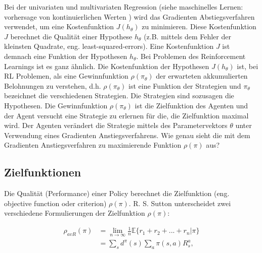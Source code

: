 \documentclass[conference]{IEEEtran}
\begin{document}
Bei der univariaten und multivariaten Regression (siehe maschinelles Lernen: vorhersage von kontinuierlichen Werten \cite{goodfellow_16}) wird das Gradienten Abstiegsverfahren verwendet, um eine Kostenfunktion $J(h_\theta)$ zu minimieren. Diese Kostenfunktion $J$ berechnet die Qualität einer Hypothese $h_\theta$ (z.B. mittels dem Fehler der kleinsten Quadrate, eng. least-squared-errors). Eine Kostenfunktion $J$ ist demnach eine Funktion der Hypothesen $h_\theta$. Bei Problemen des Reinforcement Learnings ist es ganz ähnlich. Die Kostenfunktion der Hypothesen $J(h_\theta)$ ist, bei RL Problemen, als eine Gewinnfunktion $\rho(\pi_\theta)$ der erwarteten akkumulierten Belohnungen zu verstehen, d.h. $\rho(\pi_\theta)$ ist eine Funktion der Strategien und $\pi_\theta$ bezeichnet die verschiedenen Strategien. Die Strategien sind sozusagen die Hypothesen. Die Gewinnfunktion $\rho(\pi_\theta)$ ist die Zielfunktion des Agenten und der Agent versucht eine Strategie zu erlernen für die, die Zielfunktion maximal wird. Der Agenten verändert die Strategie mittels des Parametervektors $\theta$ unter Verwendung eines Gradienten Anstiegsverfahrens. Wie genau sieht die mit dem Gradienten Anstiegsverfahren zu maximierende Funktion $\rho(\pi)$ aus?

\subsection{Zielfunktionen}
Die Qualität (Performance) einer Policy berechnet die Zielfunktion (eng. objective function oder criterion) $\rho(\pi)$. R. S. Sutton \cite{sutton_99} unterscheidet zwei verschiedene Formulierungen der Zielfunktion $\rho(\pi)$: 

\begin{equation*}
\begin{aligned}
\rho_{avR}(\pi) & = \lim\limits_{n \rightarrow \infty}{\frac{1}{n} \mathbb{E}\{r_1 + r_2 + ... + r_n | \pi\}} \\
& = \sum_s d^\pi (s) \sum_a \pi(s,a) R^a_s,
\end{aligned}
\end{equation*}
\end{document}

